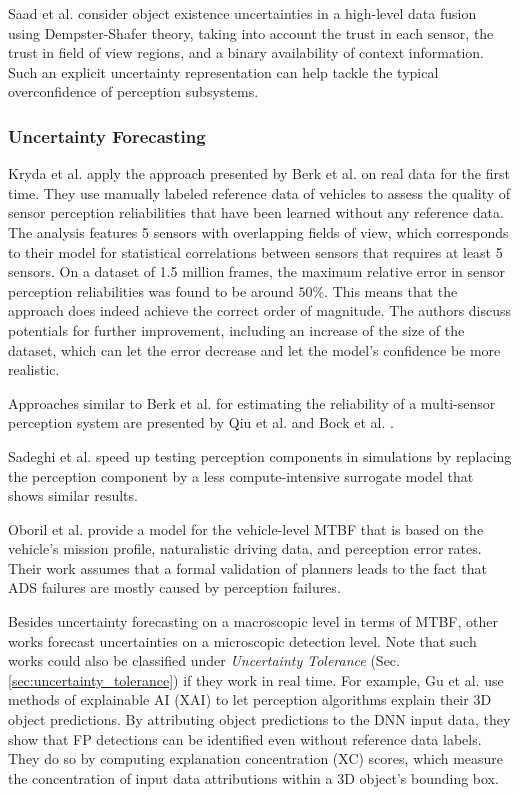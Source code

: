 \documentclass[conference]{IEEEtran}
\newcommand{\citeold}[1]{{\hypersetup{citecolor=black}\cite{#1}}}
\begin{document}
Saad et al. \cite{Saad2022uncertainty} consider object existence uncertainties in a high-level data fusion using Dempster-Shafer theory, taking into account the trust in each sensor, the trust in field of view regions, and a binary availability of context information. Such an explicit uncertainty representation can help tackle the typical overconfidence of perception subsystems. 

\subsubsection{Uncertainty Forecasting}
\label{sec:uncertainty_forecasting}

Kryda et al. \cite{Kryda2021} apply the approach presented by Berk et al. \citeold{berk2019exploiting} on real data for the first time. 
They use manually labeled reference data of vehicles to assess the quality of sensor perception reliabilities that have been learned without any reference data. 
The analysis features 5 sensors with overlapping fields of view, which corresponds to their model for statistical correlations between sensors that requires at least 5 sensors.
On a dataset of 1.5 million frames, the maximum relative error in sensor perception reliabilities was found to be around $50\%$.
This means that the approach does indeed achieve the correct order of magnitude. 
The authors discuss potentials for further improvement, including an increase of the size of the dataset, which can let the error decrease and let the model's confidence be more realistic. 



Approaches similar to Berk et al. \citeold{berk2019exploiting} for estimating the reliability of a multi-sensor perception system are presented by Qiu et al. \cite{Qiu2021reliability} and Bock et al. \cite{Bock2018reliability}.

Sadeghi et al. \cite{Sadeghi2021surrogate} speed up testing perception components in simulations by replacing the perception component by a less compute-intensive surrogate model that shows similar results. 



Oboril et al. \cite{Oboril2022mtbf_ieee} provide a model for the vehicle-level MTBF that is based on the vehicle's mission profile, naturalistic driving data, and perception error rates. 
Their work assumes that a formal validation of planners leads to the fact that ADS failures are mostly caused by perception failures.


Besides uncertainty forecasting on a macroscopic level in terms of MTBF, other works forecast uncertainties on a microscopic detection level. 
Note that such works could also be classified under \textit{Uncertainty Tolerance} (Sec. \ref{sec:uncertainty_tolerance}) if they work in real time.
For example, Gu et al. \cite{Gu2022explanations} use methods of explainable AI (XAI) to let perception algorithms explain their 3D object predictions. 
By attributing object predictions to the DNN input data, they show that FP detections can be identified even without reference data labels. 
They do so by computing explanation concentration (XC) scores, which measure the concentration of input data attributions within a 3D object's bounding box. 
\end{document}
